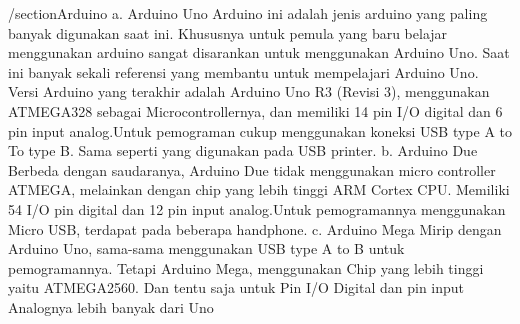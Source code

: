 /section{Arduino}
a. Arduino Uno
 Arduino ini adalah jenis arduino yang paling banyak digunakan saat ini. Khususnya untuk pemula yang baru belajar menggunakan arduino sangat disarankan untuk menggunakan Arduino Uno. Saat ini banyak sekali referensi yang membantu untuk mempelajari Arduino Uno. Versi Arduino yang terakhir adalah Arduino Uno R3 (Revisi 3), menggunakan ATMEGA328 sebagai Microcontrollernya, dan memiliki 14 pin I/O digital dan 6 pin input analog.Untuk pemograman cukup menggunakan koneksi USB type A to To type B. Sama seperti yang digunakan pada USB printer.
b. Arduino Due
Berbeda dengan saudaranya, Arduino Due tidak menggunakan micro controller ATMEGA, melainkan dengan chip yang lebih tinggi ARM Cortex CPU. Memiliki 54 I/O pin digital dan 12 pin input analog.Untuk pemogramannya menggunakan Micro USB, terdapat pada beberapa handphone.
c. Arduino Mega Mirip dengan Arduino Uno, sama-sama menggunakan USB type A to B untuk pemogramannya. Tetapi Arduino Mega, menggunakan Chip yang lebih tinggi yaitu ATMEGA2560. Dan tentu saja untuk Pin I/O Digital dan pin input Analognya lebih banyak dari Uno
